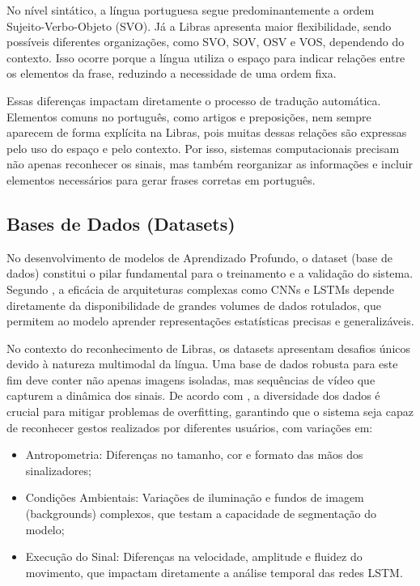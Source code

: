 \documentclass[
    12pt,                %
    openright,           %
    oneside,             %
    a4paper,             %
    english,             %
    brazil               %
]{abntex2}
\begin{document}
No nível sintático, a língua portuguesa segue predominantemente a ordem Sujeito-Verbo-Objeto (SVO). Já a Libras apresenta maior flexibilidade, sendo possíveis diferentes organizações, como SVO, SOV, OSV e VOS, dependendo do contexto. Isso ocorre porque a língua utiliza o espaço para indicar relações entre os elementos da frase, reduzindo a necessidade de uma ordem fixa.

Essas diferenças impactam diretamente o processo de tradução automática. Elementos comuns no português, como artigos e preposições, nem sempre aparecem de forma explícita na Libras, pois muitas dessas relações são expressas pelo uso do espaço e pelo contexto. Por isso, sistemas computacionais precisam não apenas reconhecer os sinais, mas também reorganizar as informações e incluir elementos necessários para gerar frases corretas em português.


\subsection{Bases de Dados (Datasets)}

No desenvolvimento de modelos de Aprendizado Profundo, o dataset (base de dados) constitui o pilar fundamental para o treinamento e a validação do sistema. Segundo , a eficácia de arquiteturas complexas como CNNs e LSTMs depende diretamente da disponibilidade de grandes volumes de dados rotulados, que permitem ao modelo aprender representações estatísticas precisas e generalizáveis.

No contexto do reconhecimento de Libras, os datasets apresentam desafios únicos devido à natureza multimodal da língua. Uma base de dados robusta para este fim deve conter não apenas imagens isoladas, mas sequências de vídeo que capturem a dinâmica dos sinais. De acordo com , a diversidade dos dados é crucial para mitigar problemas de overfitting, garantindo que o sistema seja capaz de reconhecer gestos realizados por diferentes usuários, com variações em:

\begin{itemize}
\item {Antropometria:} Diferenças no tamanho, cor e formato das mãos dos sinalizadores;
\item {Condições Ambientais:} Variações de iluminação e fundos de imagem (backgrounds) complexos, que testam a capacidade de segmentação do modelo;
\item {Execução do Sinal:} Diferenças na velocidade, amplitude e fluidez do movimento, que impactam diretamente a análise temporal das redes LSTM.
\end{itemize}
\end{document}

